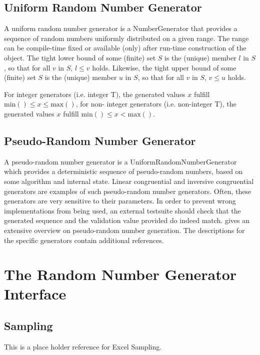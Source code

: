 \subsection{Uniform Random Number Generator}

A uniform random number generator is a NumberGenerator that provides a sequence of random numbers uniformly 
distributed on a given range. The range can be compile-time fixed or available (only) after run-time construction of the 
object.  
The tight lower bound of some (finite) set $S$ is the (unique) member $l$ in $S$, so that for all $v$ in $S$, $l \leq v$ holds. Likewise, the 
tight upper bound of some (finite) set $S$ is the (unique) member $u$ in $S$, so that for all $v$ in $S$, $v \leq u$ holds.  

For integer generators (i.e. integer T), the generated values $x$ fulfill $\text{min}() \leq x \leq \text{max}()$, for non-
integer generators (i.e. non-integer T), the generated values $x$ fulfill $\text{min}() \leq x < \text{max}()$.  


\subsection{Pseudo-Random Number Generator}

A pseudo-random number generator is a UniformRandomNumberGenerator which provides a deterministic sequence of 
pseudo-random numbers, based on some algorithm and internal state. Linear congruential and inversive 
congruential generators are examples of such pseudo-random number generators. Often, these generators are very 
sensitive to their parameters. In order to prevent wrong implementations from being used, an external testsuite should 
check that the generated sequence and the validation value provided do indeed match.  
\cite{Knuth_1997} gives an extensive overview on pseudo-random number generation. The descriptions for the specific generators contain additional 
references.  




\section{The Random Number Generator Interface}
\label{RandomNumberInterface}



\subsection{Sampling}
\label{Sampling} 
This is a place holder reference for Excel Sampling.




